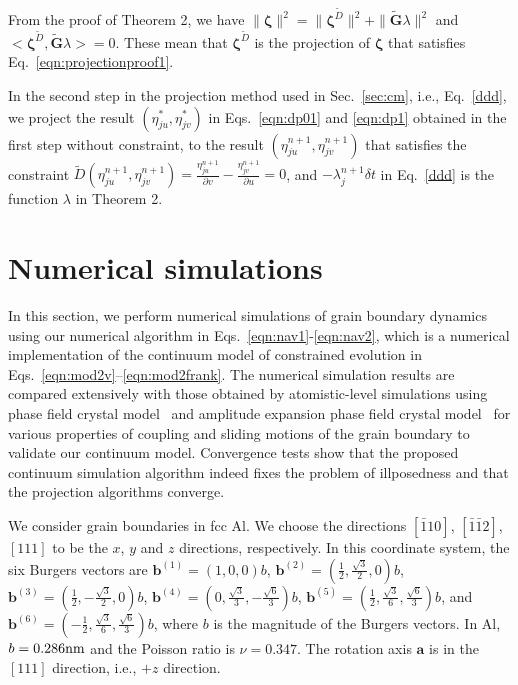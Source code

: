 \begin{remark}
From the proof of Theorem 2, we have $\|\bm{\zeta}\|^2= \|\bm{\zeta}^{\tilde { D}}\|^2+\|\tilde{\mathbf{G}}\lambda\|^2$ and $<\bm{\zeta}^{\tilde { D}}, \tilde{\mathbf{G}}\lambda >=0$.
These mean that $\bm{\zeta}^{\tilde{ D}}$ is the projection of $\bm{\zeta}$ that satisfies Eq.~\eqref{eqn:projectionproof1}.
\end{remark}

\begin{remark}
In the second step in the projection method used in Sec.~\ref{sec:cm}, i.e., Eq.~\eqref{ddd}, we project the result $(\eta^*_{ju},\eta^*_{jv})$ in Eqs.~\eqref{eqn:dp01} and \eqref{eqn:dp1} obtained in  the first step without constraint, to the result $(\eta^{n+1}_{ju},\eta^{n+1}_{jv})$ that satisfies the constraint $\tilde{{D}}(\eta^{n+1}_{ju},\eta^{n+1}_{jv})=\frac{\eta^{n+1}_{ju}}{\partial v}-\frac{\eta^{n+1}_{jv}}{\partial u} =0$, and $-\lambda^{n+1}_j\delta t$ in Eq.~\eqref{ddd} is the function $\lambda$ in Theorem 2.
\end{remark}




\section{Numerical simulations}\label{sec:nr}
In this section, we perform numerical simulations of grain boundary dynamics using our numerical algorithm in Eqs.~\eqref{eqn:nav1}-\eqref{eqn:nav2}, which is a numerical implementation of the continuum model of constrained evolution in Eqs.~\eqref{eqn:mod2v}--\eqref{eqn:mod2frank}. The numerical simulation results are compared extensively with those obtained by atomistic-level simulations using phase field crystal model~\cite{yamanaka2017phase} and amplitude expansion phase field crystal model~\cite{salvalaglio2018defects} for various properties of coupling and sliding motions of the grain boundary to validate our continuum model. Convergence tests show that the proposed continuum simulation algorithm indeed fixes the problem of illposedness and that the projection algorithms converge.

We consider grain boundaries in fcc Al. We choose the directions $[\bar{1}10]$, $[\bar{1}\bar{1}2]$, $[111]$ to be the $x$, $y$ and $z$ directions, respectively. In this coordinate system, the six Burgers vectors are $\mathbf{b}^{(1)}=(1,0,0)b$, $\mathbf{b}^{(2)}=\left(\frac{1}{2},\frac{\sqrt{3}}{2},0\right)b$, $\mathbf{b}^{(3)}=\left(\frac{1}{2},-\frac{\sqrt{3}}{2},0\right)b$,
$\mathbf{b}^{(4)}=\left(0,\frac{\sqrt{3}}{3},-\frac{\sqrt{6}}{3}\right)b$,
$\mathbf{b}^{(5)}=\left(\frac{1}{2},\frac{\sqrt{3}}{6},\frac{\sqrt{6}}{3}\right)b$, and
$\mathbf{b}^{(6)}=\left(-\frac{1}{2},\frac{\sqrt{3}}{6},\frac{\sqrt{6}}{3}\right)b$, where $b$ is the magnitude of the Burgers vectors. In Al, $b=0.286\rm nm$ and the Poisson ratio is $\nu=0.347$. The rotation axis $\mathbf a$ is in the $[111]$ direction, i.e., $+z$ direction.

